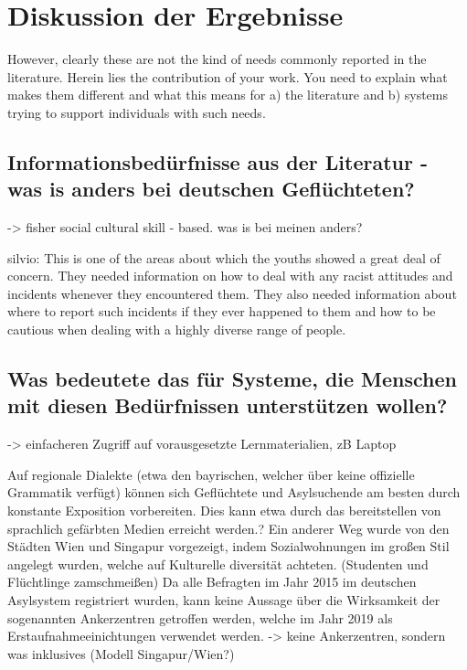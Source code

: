 \section{Diskussion der Ergebnisse}

However, clearly these are not the kind of needs commonly reported in the literature. Herein lies the contribution of your work. You need to explain what makes them different and what this means for a) the literature and b) systems trying to support individuals with such needs.


\subsection{Informationsbedürfnisse aus der Literatur - was is anders bei deutschen Geflüchteten?}

-> fisher social cultural skill - based. was is bei meinen anders?

silvio:
This is one of the areas about which the youths showed a great deal of concern. They
needed information on how to deal with any racist attitudes and incidents whenever
they encountered them. They also needed information about where to report such
incidents if they ever happened to them and how to be cautious when dealing with a
highly diverse range of people.

\subsection{Was bedeutete das für Systeme, die Menschen mit diesen Bedürfnissen unterstützen wollen?}

->  einfacheren Zugriff auf vorausgesetzte Lernmaterialien, zB Laptop

Auf regionale Dialekte (etwa den bayrischen, welcher über keine offizielle Grammatik verfügt) können sich Geflüchtete und Asylsuchende am besten durch konstante Exposition vorbereiten. Dies kann etwa durch das bereitstellen von sprachlich gefärbten Medien erreicht werden.?
Ein anderer Weg wurde von den Städten Wien und Singapur vorgezeigt, indem Sozialwohnungen im großen Stil angelegt wurden, welche auf Kulturelle diversität achteten. (Studenten und Flüchtlinge zamschmeißen)
Da alle Befragten im Jahr 2015 im deutschen Asylsystem registriert wurden, kann keine Aussage über die Wirksamkeit der sogenannten Ankerzentren getroffen werden, welche im Jahr 2019 als Erstaufnahmeeinichtungen verwendet werden.
        -> keine Ankerzentren, sondern was inklusives (Modell Singapur/Wien?)




